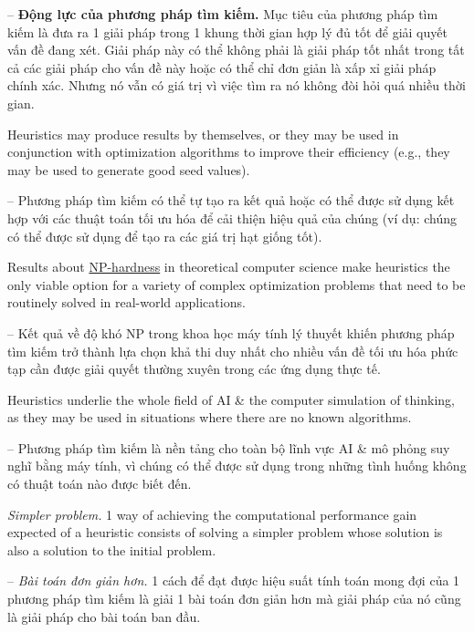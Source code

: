 \documentclass{article}
\begin{document}
-- {\bf Động lực của phương pháp tìm kiếm.} Mục tiêu của phương pháp tìm kiếm là đưa ra 1 giải pháp trong 1 khung thời gian hợp lý đủ tốt để giải quyết vấn đề đang xét. Giải pháp này có thể không phải là giải pháp tốt nhất trong tất cả các giải pháp cho vấn đề này hoặc có thể chỉ đơn giản là xấp xỉ giải pháp chính xác. Nhưng nó vẫn có giá trị vì việc tìm ra nó không đòi hỏi quá nhiều thời gian.

Heuristics may produce results by themselves, or they may be used in conjunction with optimization algorithms to improve their efficiency (e.g., they may be used to generate good seed values).

-- Phương pháp tìm kiếm có thể tự tạo ra kết quả hoặc có thể được sử dụng kết hợp với các thuật toán tối ưu hóa để cải thiện hiệu quả của chúng (ví dụ: chúng có thể được sử dụng để tạo ra các giá trị hạt giống tốt).

Results about \href{https://en.wikipedia.org/wiki/NP-hard}{NP-hardness} in theoretical computer science make heuristics the only viable option for a variety of complex optimization problems that need to be routinely solved in real-world applications.

-- Kết quả về độ khó NP trong khoa học máy tính lý thuyết khiến phương pháp tìm kiếm trở thành lựa chọn khả thi duy nhất cho nhiều vấn đề tối ưu hóa phức tạp cần được giải quyết thường xuyên trong các ứng dụng thực tế.

Heuristics underlie the whole field of AI \& the computer simulation of thinking, as they may be used in situations where there are no known algorithms.

-- Phương pháp tìm kiếm là nền tảng cho toàn bộ lĩnh vực AI \& mô phỏng suy nghĩ bằng máy tính, vì chúng có thể được sử dụng trong những tình huống không có thuật toán nào được biết đến.

{\it Simpler problem.} 1 way of achieving the computational performance gain expected of a heuristic consists of solving a simpler problem whose solution is also a solution to the initial problem.

-- {\it Bài toán đơn giản hơn.} 1 cách để đạt được hiệu suất tính toán mong đợi của 1 phương pháp tìm kiếm là giải 1 bài toán đơn giản hơn mà giải pháp của nó cũng là giải pháp cho bài toán ban đầu.
\end{document}

